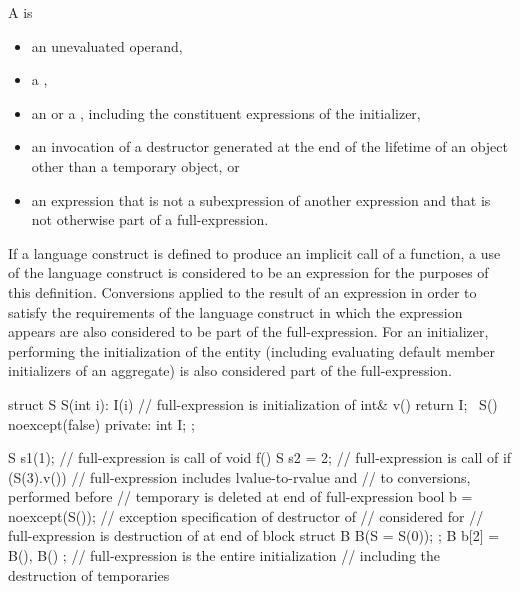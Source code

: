 \pnum
A  is
\begin{itemize}
\item
an unevaluated operand,
\item
a ,
\item
an  or
a ,
including the constituent expressions of the initializer,
\item
an invocation of a destructor generated at the end of the lifetime
of an object other than a temporary object, or
\item
an expression that is not a subexpression of another expression and
that is not otherwise part of a full-expression.
\end{itemize}
If a language construct is defined to produce an implicit call of a function,
a use of the language construct is considered to be an expression
for the purposes of this definition.
Conversions applied to the result of an expression in order to satisfy the requirements
of the language construct in which the expression appears
are also considered to be part of the full-expression.
For an initializer, performing the initialization of the entity
(including evaluating default member initializers of an aggregate)
is also considered part of the full-expression.
\begin{example}
\begin{codeblock}
struct S {
  S(int i): I(i) { }       // full-expression is initialization of 
  int& v() { return I; }
  ~S() noexcept(false) { }
private:
  int I;
};

S s1(1);                   // full-expression is call of 
void f() {
  S s2 = 2;                // full-expression is call of 
  if (S(3).v())            // full-expression includes lvalue-to-rvalue and
                           //  to  conversions, performed before
                           // temporary is deleted at end of full-expression
  { }
  bool b = noexcept(S());  // exception specification of destructor of 
                           // considered for 
  // full-expression is destruction of  at end of block
}
struct B {
  B(S = S(0));
};
B b[2] = { B(), B() };     // full-expression is the entire initialization
                           // including the destruction of temporaries
\end{codeblock}
\end{example}

